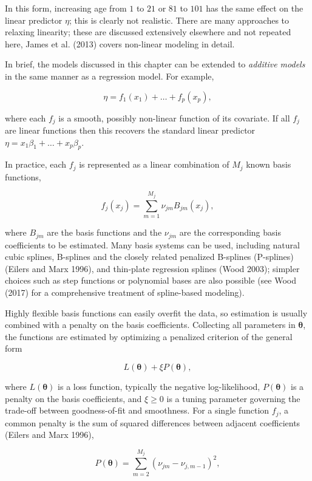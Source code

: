 \documentclass[
  letterpaper,
  krantz2]{style/krantz}
\begin{document}
In this form, increasing age from \(1\) to \(21\) or \(81\) to \(101\)
has the same effect on the linear predictor \(\eta\); this is clearly
not realistic. There are many approaches to relaxing linearity; these
are discussed extensively elsewhere and not repeated here, James et al.
(2013) covers non-linear modeling in detail.

In brief, the models discussed in this chapter can be extended to
\emph{additive models} in the same manner as a regression model.
 For example,

\[
\eta = f_1(x_1) + \ldots + f_p(x_p),
\]

where each \(f_j\) is a smooth, possibly non-linear function of its
covariate. If all \(f_j\) are linear functions then this recovers the
standard linear predictor \(\eta = x_1\beta_1 + \ldots + x_p\beta_p\).

In practice, each \(f_j\) is represented as a linear combination of
\(M_j\) known basis functions,

\[
f_j(x_j) = \sum_{m=1}^{M_j} \nu_{jm} B_{jm}(x_j),
\]

where \(B_{jm}\) are the basis functions and the \(\nu_{jm}\) are the
corresponding basis coefficients to be estimated. Many basis systems can
be used, including natural cubic splines, B-splines and the closely
related penalized B-splines (P-splines) (Eilers and Marx 1996), and
thin-plate regression splines (Wood 2003); simpler choices such as step
functions or polynomial bases are also possible (see Wood (2017) for a
comprehensive treatment of spline-based
modeling).

Highly flexible basis functions can easily overfit the data, so
estimation is usually combined with a penalty on the basis coefficients.
Collecting all parameters in \(\boldsymbol{\theta}\), the functions are
estimated by optimizing a penalized criterion of the general form

\[
L(\boldsymbol{\theta}) + \xi P(\boldsymbol{\theta}),
\]

where \(L(\boldsymbol{\theta})\) is a loss function, typically the
negative log-likelihood, \(P(\boldsymbol{\theta})\) is a penalty on the
basis coefficients, and \(\xi \geq 0\) is a tuning parameter governing
the trade-off between goodness-of-fit and smoothness. For a single
function \(f_j\), a common penalty is the sum of squared differences
between adjacent coefficients (Eilers and Marx 1996),

\[
P(\boldsymbol{\theta}) = \sum_{m=2}^{M_j} (\nu_{jm} - \nu_{j,m-1})^2,
\]
\end{document}
